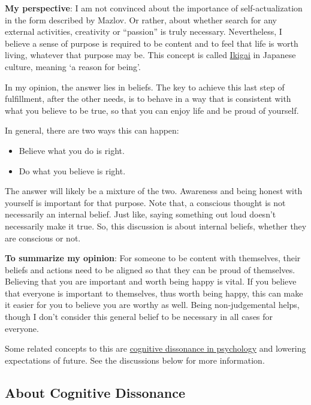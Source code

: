 \documentclass[
]{book}
\providecommand{\tightlist}{%
  \setlength{\itemsep}{0pt}\setlength{\parskip}{0pt}}
\begin{document}
\textbf{My perspective}: I am not convinced about the importance of self-actualization in the form described by Mazlov. Or rather, about whether search for any external activities, creativity or ``passion'' is truly necessary. Nevertheless, I believe a sense of purpose is required to be content and to feel that life is worth living, whatever that purpose may be. This concept is called \href{https://en.wikipedia.org/wiki/Ikigai}{Ikigai} in Japanese culture, meaning `a reason for being'.

In my opinion, the answer lies in beliefs. The key to achieve this last step of fulfillment, after the other needs, is to behave in a way that is consistent with what you believe to be true, so that you can enjoy life and be proud of yourself.

In general, there are two ways this can happen:

\begin{itemize}
\tightlist
\item
  Believe what you do is right.
\item
  Do what you believe is right.
\end{itemize}

The answer will likely be a mixture of the two. Awareness and being honest with yourself is important for that purpose. Note that, a conscious thought is not necessarily an internal belief. Just like, saying something out loud doesn't necessarily make it true. So, this discussion is about internal beliefs, whether they are conscious or not.

\textbf{To summarize my opinion}: For someone to be content with themselves, their beliefs and actions need to be aligned so that they can be proud of themselves. Believing that you are important and worth being happy is vital. If you believe that everyone is important to themselves, thus worth being happy, this can make it easier for you to believe you are worthy as well. Being non-judgemental helps, though I don't consider this general belief to be necessary in all cases for everyone.

Some related concepts to this are \href{https://en.wikipedia.org/wiki/Cognitive_dissonance}{cognitive dissonance in psychology} and lowering expectations of future. See the discussions below for more information.

\hypertarget{about-cognitive-dissonance}{%
\subsection{About Cognitive Dissonance}\label{about-cognitive-dissonance}}
\end{document}
